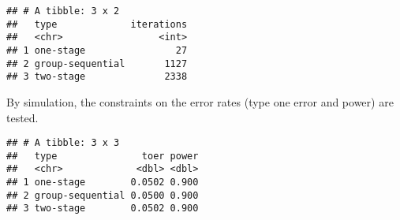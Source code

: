 \documentclass[]{book}
\newenvironment{Shaded}{\begin{snugshade}}{\end{snugshade}}
\newcommand{\DataTypeTok}[1]{\textcolor[rgb]{0.13,0.29,0.53}{#1}}
\newcommand{\DecValTok}[1]{\textcolor[rgb]{0.00,0.00,0.81}{#1}}
\newcommand{\FloatTok}[1]{\textcolor[rgb]{0.00,0.00,0.81}{#1}}
\newcommand{\KeywordTok}[1]{\textcolor[rgb]{0.13,0.29,0.53}{\textbf{#1}}}
\newcommand{\NormalTok}[1]{#1}
\newcommand{\OperatorTok}[1]{\textcolor[rgb]{0.81,0.36,0.00}{\textbf{#1}}}
\newcommand{\StringTok}[1]{\textcolor[rgb]{0.31,0.60,0.02}{#1}}
\begin{document}
\begin{verbatim}
## # A tibble: 3 x 2
##   type             iterations
##   <chr>                 <int>
## 1 one-stage                27
## 2 group-sequential       1127
## 3 two-stage              2338
\end{verbatim}

By simulation, the constraints on the error rates (type one error and power)
are tested.

\begin{Shaded}
\end{Shaded}

\begin{verbatim}
## # A tibble: 3 x 3
##   type               toer power
##   <chr>             <dbl> <dbl>
## 1 one-stage        0.0502 0.900
## 2 group-sequential 0.0500 0.900
## 3 two-stage        0.0502 0.900
\end{verbatim}
\end{document}
